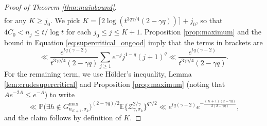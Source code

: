 \documentclass{amsart}
\theoremstyle{definition}
\theoremstyle{remark}
\numberwithin{equation}{section}
\begin{document}
\begin{proof}[Proof of Theorem \ref{thm:mainbound}]
\begin{align*}
\end{align*}
for any $K\geq j_0$. We pick $K=\lceil2\log (t^{3q\gamma/4}(2-\gamma q))\rceil+j_0$, so that $4C_0<n_j\leq t/\log t$ for each $j_0\leq j\leq K+1$. Proposition \ref{prop:maximum} and the bound in Equation \eqref{eq:supercritical_ongood} imply that the terms in brackets are
\[
    \ll \frac{e^{tq(\gamma-2)}}{t^{3\gamma q/4}(2-\gamma q)}\sum_{j\geq 1} e^{-j}j^{1-q}(j+1)^q\ll\frac{e^{tq(\gamma-2)}}{t^{3\gamma q/4}(2-\gamma q)}.
\]
For the remaining term, we use Hölder's inequality, Lemma \ref{lem:crudesupercritical} and Proposition \ref{prop:maximum} (noting that $Ae^{-2A}\leq e^{-A}$) to write
\[
    \ll \mathbb{P}\big(\exists h\notin G_{n_{K+1},\sigma_k}^{\text{max}}\big)^{(2-\gamma q)/2}  \mathbb{E}\big\{\mathcal{Z}_{\gamma,\sigma_k}^{2/\gamma}\big\}^{q{\gamma/2}} \ll e^{tq(\gamma-2)} e^{-\frac{(K+1)(2-\gamma q)}{2(2-\gamma q)}},
\]
and the claim follows by definition of $K$.
\end{proof}
\end{document}
